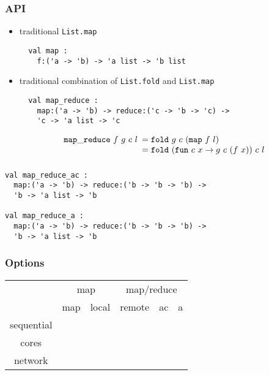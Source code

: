 \documentclass{beamer}
\begin{document}
\begin{frame}[fragile]\frametitle{API}
  \begin{itemize}
  \item traditional \texttt{List.map}
\begin{verbatim}
  val map : 
    f:('a -> 'b) -> 'a list -> 'b list
\end{verbatim}

    \bigskip
  \item traditional combination of \texttt{List.fold} and \texttt{List.map}
  
\begin{verbatim}
  val map_reduce :
    map:('a -> 'b) -> reduce:('c -> 'b -> 'c) -> 
    'c -> 'a list -> 'c
\end{verbatim}
    \begin{displaymath}
      \mathtt{map\_reduce}~f~g~c~l
      \begin{array}[t]{l}
        = \mathtt{fold}~g~c~(\mathtt{map}~f~l) \\
        = \mathtt{fold}~(\mathtt{fun}~c~x\rightarrow g~c~(f~x))~c~l\\
      \end{array}
    \end{displaymath}
  \end{itemize}
\end{frame}

\begin{frame}[fragile]\frametitle{}
\begin{verbatim}
val map_reduce_ac :
  map:('a -> 'b) -> reduce:('b -> 'b -> 'b) -> 
  'b -> 'a list -> 'b
    
val map_reduce_a :
  map:('a -> 'b) -> reduce:('b -> 'b -> 'b) -> 
  'b -> 'a list -> 'b
\end{verbatim}
\end{frame}

\begin{frame}\frametitle{Options}
  \begin{center}
    \begin{tabular}{|c|c|c|c|c|c|}
      \hline
                 & \multicolumn{2}{|c|}{map} &
                 \multicolumn{3}{|c|}{map/reduce} \\\cline{2-6}
                 & map & local & remote & ac & a \\\hline\hline
      sequential & & & & & \\\hline
      cores      & & & & & \\\hline
      network    & & & & & \\\hline
    \end{tabular}
  \end{center}
\end{frame}
\end{document}
